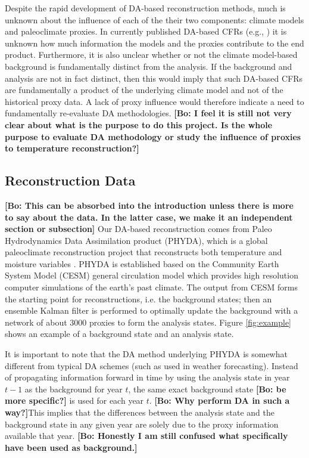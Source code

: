 \documentclass[12pt]{article}
\newcommand{\bl}[1]{\color{Red}\textbf{[Bo: #1]}\normalcolor}
\begin{document}

Despite the rapid development of DA-based reconstruction methods, much is unknown about the influence of each of the their two components: climate models and paleoclimate proxies. In currently published DA-based CFRs (e.g., \citet{steiger2018PHYDA}) it is unknown how much information the models and the proxies contribute to the end product. Furthermore, it is also unclear whether or not the climate model-based background is fundamentally distinct from the analysis. If the background and analysis are not in fact distinct, then this would imply that such DA-based CFRs are fundamentally a product of the underlying climate model and not of the historical proxy data. A lack of proxy influence would therefore indicate a need to fundamentally re-evaluate DA methodologies.
\bl{I feel it is still not very clear about what is the purpose to do this project. Is the whole purpose to evaluate DA methodology or study the influence of proxies to temperature reconstruction?}

\subsection{Reconstruction Data} \label{data}
\bl{This can be absorbed into the introduction unless there is more to say about the data. In the latter case, we make it an independent section or subsection}
Our DA-based reconstruction comes from Paleo Hydrodynamics Data Assimilation product (PHYDA), which is a global paleoclimate reconstruction project that reconstructs both temperature and moisture variables \citep{steiger2018PHYDA}. PHYDA is established based on the Community Earth System Model (CESM) general circulation model which provides high resolution computer simulations of the earth's past climate. The output from CESM forms the starting point for reconstructions, i.e. the background states; then an ensemble Kalman filter is performed to optimally update the background with a network of about 3000 proxies to form the analysis states. Figure \ref{fig:example} shows an example of a background state and an analysis state. 

It is important to note that the DA method underlying PHYDA is somewhat different from typical DA schemes (such as used in weather forecasting). Instead of propagating information forward in time by using the analysis state in year $t-1$ as the background for year $t$, the same exact background state \bl{be more specific?} is used for each year $t$. \bl{Why perform DA in such a way?}This implies that the differences between the analysis state and the background state in any given year are solely due to the proxy information available that year. \bl{Honestly I am still confused what specifically have been used as background.}
\end{document}
